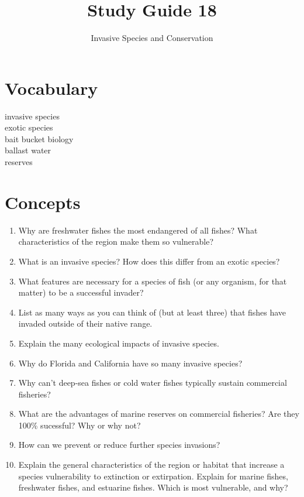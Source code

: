 \documentclass[letterpaper]{tufte-handout}
\title{Study Guide 18}
\author{Invasive Species and Conservation}
\date{} %
\begin{document}
\maketitle	%


\section{Vocabulary} 
\vspace{-1\baselineskip}
\begin{multicols}{2}
invasive species \\
exotic species \\
bait bucket biology \\
ballast water \\
reserves
\end{multicols}

\section{Concepts}

\begin{enumerate}
	\item Why are freshwater fishes the most endangered of all fishes?  What characteristics of the region make them so vulnerable?

	\item What is an invasive species?  How does this differ from an exotic species?

	\item What features are necessary for a species of fish (or any organism, for that matter) to be a successful invader?

	\item List as many ways as you can think of (but at least three) that fishes have invaded outside of their native range.

	\item Explain the many ecological impacts of invasive species.

	\item Why do Florida and California have so many invasive species?

	\item Why can’t deep-sea fishes or cold water fishes typically sustain commercial fisheries?

	\item What are the advantages of marine reserves on commercial fisheries?  Are they 100\% sucessful? Why or why not?

	\item How can we prevent or reduce further species invasions?  

	\item Explain the general characteristics of the region or habitat that increase a species vulnerability to extinction or extirpation.  Explain for marine fishes, freshwater fishes, and estuarine fishes.  Which is most vulnerable, and why? 

\end{enumerate}
\end{document}
